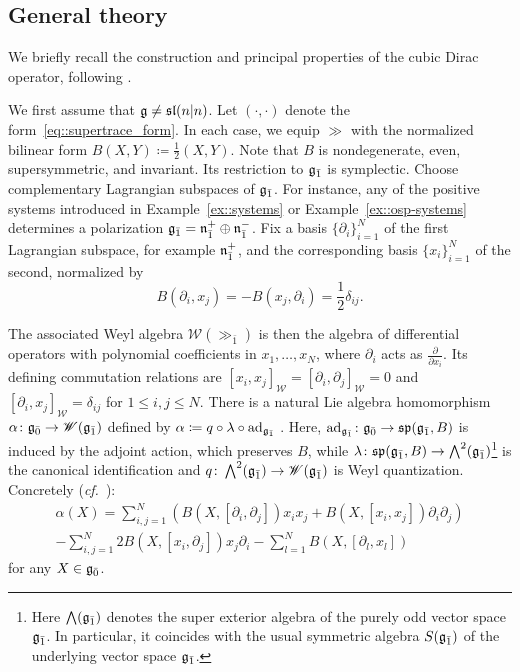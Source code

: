 \subsection{General theory} \label{subsec::Dirac_general_theory} We briefly recall the construction and principal properties of the cubic Dirac operator, following \cite{huang2005dirac, Schmidt_perturbations}.

We first assume that $\gg\neq\sl(n\vert n)$. Let $(\cdot,\cdot)$
denote the form~\eqref{eq::supertrace_form}. In each
case, we equip $\gg$ with the normalized bilinear form $B(X,Y)\coloneqq\frac12(X,Y)$. Note that $B$ is nondegenerate, even, supersymmetric, and invariant. Its restriction to $\odd$ is symplectic. Choose complementary Lagrangian subspaces of $\odd$. For instance, any of the positive systems introduced in Example~\ref{ex::systems} or Example~\ref{ex::osp-systems} determines a polarization $\odd=\nn_{\bar1}^{+}\oplus\nn_{\bar1}^{-}$. Fix a basis $\{\partial_i\}_{i=1}^{N}$ of the first Lagrangian subspace, for example $\nn_{\bar1}^{+}$, and the corresponding basis $\{x_i\}_{i=1}^{N}$ of the second, normalized by
\begin{equation}
B(\partial_i,x_j)=-B(x_j,\partial_i)=\frac12\delta_{ij}.
\end{equation}

The associated Weyl algebra $\mathscr W(\gg_{\bar1})$ is then the algebra of differential operators with polynomial coefficients in $x_1,\ldots,x_{N}$, where $\partial_i$ acts as $\frac{\partial}{\partial x_i}$. Its defining commutation relations are $[x_i,x_j]_{\mathscr{W}}=[\partial_i,\partial_j]_{\mathscr{W}}=0$ and $[\partial_i,x_j]_{\mathscr{W}}=\delta_{ij}$ for $1\leq i,j\leq N$. There is a natural Lie algebra homomorphism $\alpha\colon\even\to\mathscr W(\odd)$ defined by $\alpha\coloneqq q\circ\lambda\circ\ad_{\odd}$ \cite{huang2005dirac}. Here, $\ad_{\odd}\colon\even\to\mathfrak{sp}(\odd,B)$ is induced by the adjoint action, which preserves $B$, while $\lambda\colon\mathfrak{sp}(\odd,B)\to\bigwedge^{2}(\odd)$\footnote{Here $\bigwedge(\odd)$ denotes the super exterior algebra of the purely odd vector space $\odd$. In particular, it coincides with the usual symmetric algebra $S(\odd)$ of the underlying vector space $\odd$.} is the canonical identification and $q\colon\bigwedge^{2}(\odd)\to\mathscr W(\odd)$ is Weyl quantization. Concretely (\emph{cf.}~\cite[Equation 10]{huang2005dirac}):
\begin{multline} \label{eq::alpha_explicit}
\alpha(X)= \sum_{i,j=1}^{N}(B(X,[\partial_{i},\partial_{j}])x_{i}x_{j}+B(X,[x_{i},x_{j}])\partial_{i}\partial_{j}) 
\\ -\sum_{i,j=1}^{N}2B(X,[x_{i},\partial_{j}])x_{j}\partial_{i}-\sum_{l=1}^{N}B(X,[\partial_{l},x_{l}])
\end{multline}
for any $X\in \even$. 

